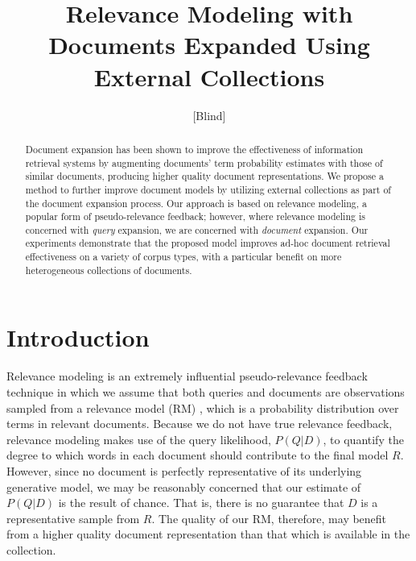 \documentclass{sig-alternate}
\begin{document}
\author{[Blind]}

\title{Relevance Modeling with Documents Expanded Using External Collections}

\maketitle
\begin{abstract}
Document expansion has been shown to improve the effectiveness of information retrieval systems by augmenting documents' term probability estimates with those of similar documents, producing higher quality document representations. We propose a method to further improve document models by utilizing external collections as part of the document expansion process. Our approach is based on relevance modeling, a popular form of pseudo-relevance feedback; however, where relevance modeling is concerned with \textit{query} expansion, we are concerned with \textit{document} expansion. Our experiments demonstrate that the proposed model improves ad-hoc document retrieval effectiveness on a variety of corpus types, with a particular benefit on more heterogeneous collections of documents.
\end{abstract}

\section{Introduction}\label{section.intro}


Relevance modeling is an extremely influential pseudo-relevance feedback technique in which we assume that both queries and documents are observations sampled from a relevance model (RM) \cite{Lavrenko2001}, which is a probability distribution over terms in relevant documents. Because we do not have true relevance feedback, relevance modeling makes use of the query likelihood, $P(Q|D)$, to quantify the degree to which words in each document should contribute to the final model $R$. However, since no document is perfectly representative of its underlying generative model, we may be reasonably concerned that our estimate of $P(Q|D)$ is the result of chance. That is, there is no guarantee that $D$ is a representative sample from $R$. The quality of our RM, therefore, may benefit from a higher quality document representation than that which is available in the collection.
\end{document}
